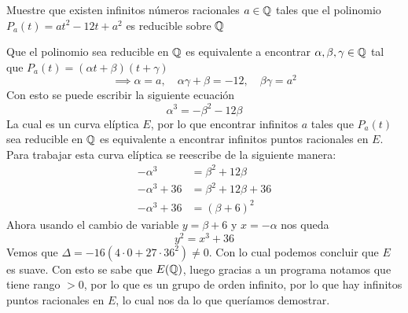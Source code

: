 \begin{prob}[10 pts.]
	Muestre que existen infinitos números racionales $a\in\mathbb{Q}$ tales que el polinomio $P_a(t)=at^2-12t+a^2$ es reducible sobre $\mathbb{Q}$
\end{prob}

\begin{sol}
	Que el polinomio sea reducible en $\mathbb{Q}$ es equivalente a encontrar $\alpha,\beta,\gamma\in\mathbb{Q}$ tal que $P_a(t)=(\alpha t+\beta)(t+\gamma)$
	\[
		\implies \alpha = a,\quad \alpha\gamma+\beta=-12,\quad \beta\gamma=a^2
	\]
	Con esto se puede escribir la siguiente ecuación
	\[
		\alpha^3=-\beta^2-12\beta
	\]
	La cual es un curva elíptica $E$, por lo que encontrar infinitos $a$ tales que $P_a(t)$ sea reducible en $\mathbb{Q}$ es equivalente a encontrar infinitos puntos racionales en $E$.\\
	Para trabajar esta curva elíptica se reescribe de la siguiente manera:
	\begin{align*}
		-\alpha^3    & =\beta^2+12\beta    \\
		-\alpha^3+36 & =\beta^2+12\beta+36 \\
		-\alpha^3+36 & =(\beta+6)^2
	\end{align*}
	Ahora usando el cambio de variable $y=\beta+6$ y $x=-\alpha$ nos queda
	\[
		y^2=x^3+36
	\]
	Vemos que $\Delta=-16(4\cdot 0+27\cdot36^2)\neq0$. Con lo cual podemos concluir que $E$ es suave. Con esto se sabe que $E(\mathbb{Q})$, luego  gracias a un programa \citep{prog} notamos que tiene rango $>0$, por lo que es un grupo de orden infinito, por lo que hay infinitos puntos racionales en $E$, lo cual nos da lo que queríamos demostrar.
\end{sol}




